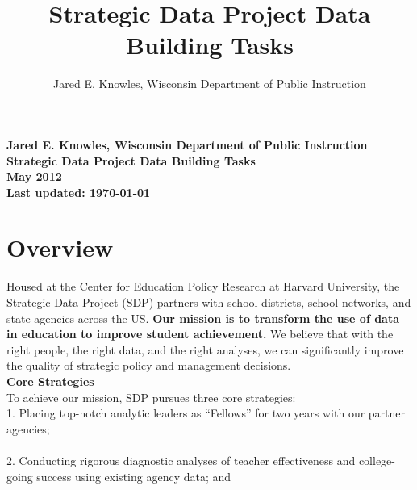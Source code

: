 \documentclass[12pt]{article}
\begin{document}

\title{Strategic Data Project Data Building Tasks}
\author{Jared E. Knowles, Wisconsin Department of Public Instruction}
\pagestyle{plain}
\setcounter{page}{1}
\graphicspath{{./img/}}

\begin{flushright}
\textbf{Jared E. Knowles, Wisconsin Department of Public Instruction}\\
\textbf{Strategic Data Project Data Building Tasks}\\
\textbf{May 2012}\\
\textbf{Last updated: \today}\\
\end{flushright}

\vspace{5mm}
\tableofcontents




\section{Overview}
Housed at the Center for Education Policy Research at Harvard University, the Strategic Data Project (SDP) partners with 
school districts, school networks, and state agencies across the US. \textbf{Our mission is to transform the use of data in education to 
improve student achievement.} We believe that with the right people, the right data, and the right analyses, we can significantly 
improve the quality of strategic policy and management decisions. \\

\textbf{Core Strategies} \\
To achieve our mission, SDP pursues three core strategies: \\

1. Placing top-notch analytic leaders as ``Fellows'' for two years with our partner agencies; \\

 \\

2. Conducting rigorous diagnostic analyses of teacher effectiveness and college-going success using existing agency data; and \\
\end{document}
